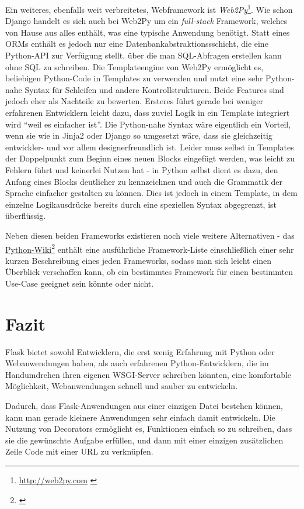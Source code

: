 Ein weiteres, ebenfalls weit verbreitetes, Webframework ist
\emph{Web2Py}\footnote{\href{http://web2py.com}{http://web2py.com} \citep{web2py}}. Wie schon Django handelt es
sich auch bei Web2Py um ein \emph{full-stack} Framework, welches von Hause aus alles enthält, was
eine typische Anwendung benötigt. Statt eines ORMs enthält es jedoch nur eine
Datenbankabstraktionssschicht, die eine Python-API zur Verfügung stellt, über die man SQL-Abfragen
erstellen kann ohne SQL zu schreiben. Die Templateengine von Web2Py ermöglicht es, beliebigen
Python-Code in Templates zu verwenden und nutzt eine sehr Python-nahe Syntax für Schleifen und
andere Kontrollstrukturen. Beide Features sind jedoch eher als Nachteile zu bewerten. Ersteres führt
gerade bei weniger erfahrenen Entwicklern leicht dazu, dass zuviel Logik in ein Template integriert
wird \enquote{weil es einfacher ist}. Die Python-nahe Syntax wäre eigentlich ein Vorteil, wenn sie
wie in Jinja2 oder Django so umgesetzt wäre, dass sie gleichzeitig entwickler- und vor allem
designerfreundlich ist. Leider muss selbst in Templates der Doppelpunkt zum Beginn eines neuen
Blocks eingefügt werden, was leicht zu Fehlern führt und keinerlei Nutzen hat - in Python selbst
dient es dazu, den Anfang eines Blocks deutlicher zu kennzeichnen und auch die Grammatik der Sprache
einfacher gestalten zu können. Dies ist jedoch in einem Template, in dem einzelne Logikausdrücke
bereits durch eine speziellen Syntax abgegrenzt, ist überflüssig.

Neben diesen beiden Frameworks existieren noch viele weitere Alternativen - das
\href{http://wiki.python.org/moin/WebFrameworks}{Python-Wiki}\footnote{\citep{pythonwebframeworks}}
enthält eine ausführliche
Framework-Liste einschließlich einer sehr kurzen Beschreibung eines jeden Frameworks, sodass man
sich leicht einen Überblick verschaffen kann, ob ein bestimmtes Framework für einen bestimmten
Use-Case geeignet sein könnte oder nicht.

\section{Fazit}
Flask bietet sowohl Entwicklern, die erst wenig Erfahrung mit Python oder Webanwendungen haben,
als auch erfahrenen Python-Entwicklern, die im Handumdrehen ihren eigenen WSGI-Server schreiben
könnten, eine komfortable Möglichkeit, Webanwendungen schnell und sauber zu entwickeln.

Dadurch, dass Flask-Anwendungen aus einer einzigen Datei bestehen können, kann man gerade kleinere
Anwendungen sehr einfach damit entwickeln. Die Nutzung von Decorators ermöglicht es, Funktionen
einfach so zu schreiben, dass sie die gewünschte Aufgabe erfüllen, und dann mit einer einzigen
zusätzlichen Zeile Code mit einer URL zu verknüpfen.


